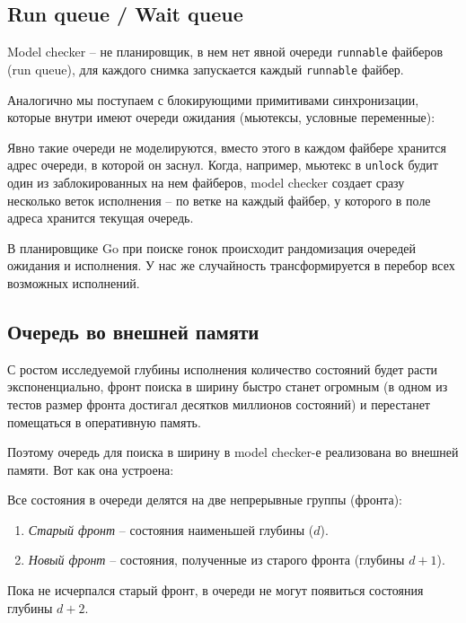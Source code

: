 \subsection{Run queue / Wait queue}

Model checker – не планировщик, в нем нет явной очереди \texttt{runnable} файберов (run queue), для каждого снимка запускается каждый \texttt{runnable} файбер. 

Аналогично мы поступаем с блокирующими примитивами синхронизации, которые внутри имеют очереди ожидания (мьютексы, условные переменные): 

Явно такие очереди не моделируются, вместо этого в каждом файбере хранится адрес очереди, в которой он заснул. Когда, например, мьютекс в \texttt{unlock} будит один из заблокированных на нем файберов, model checker создает сразу несколько веток исполнения – по ветке на каждый файбер, у которого в поле адреса хранится текущая очередь.

В планировщике Go \autocite{Go} при поиске гонок происходит рандомизация очередей ожидания и исполнения. У нас же случайность трансформируется в перебор всех возможных исполнений.


\subsection{Очередь во внешней памяти}

С ростом исследуемой глубины исполнения количество состояний будет расти экспоненциально, фронт поиска в ширину быстро станет огромным (в одном из тестов размер фронта достигал десятков миллионов состояний) и перестанет помещаться в оперативную память.

Поэтому очередь для поиска в ширину в model checker-е реализована во внешней памяти. Вот как она устроена:

Все состояния в очереди делятся на две непрерывные группы (фронта):

\begin{enumerate}

\item	\emph{Старый фронт} – состояния наименьшей глубины ($d$). 

\item	\emph{Новый фронт} – состояния, полученные из старого фронта (глубины $d+1$). 

\end{enumerate}
	
Пока не исчерпался старый фронт, в очереди не могут появиться состояния глубины $d+2$.
 
